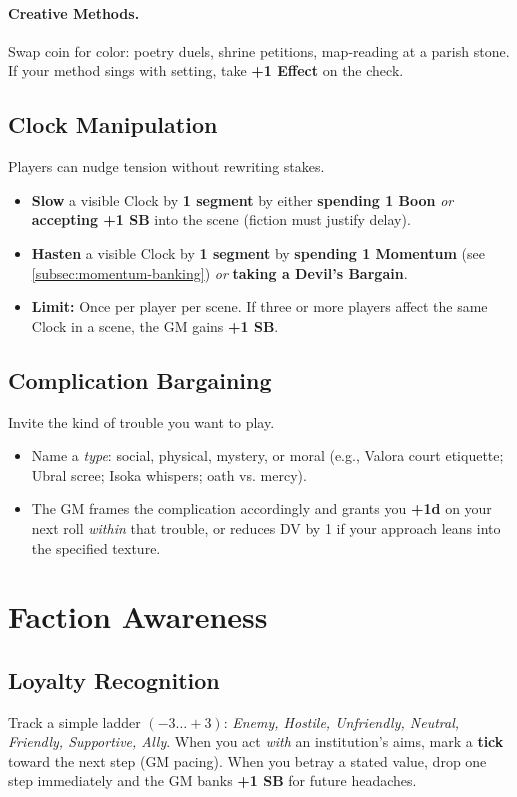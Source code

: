 \paragraph{Creative Methods.}
Swap coin for color: poetry duels, shrine petitions, map‑reading at a parish stone. If your method sings with setting, take \textbf{+1 Effect} on the check.

\subsection{Clock Manipulation}
Players can nudge tension without rewriting stakes.
\begin{itemize}
  \item \textbf{Slow} a visible Clock by \textbf{1 segment} by either \textbf{spending 1 Boon} \emph{or} \textbf{accepting +1 SB} into the scene (fiction must justify delay).
  \item \textbf{Hasten} a visible Clock by \textbf{1 segment} by \textbf{spending 1 Momentum} (see \ref{subsec:momentum-banking}) \emph{or} \textbf{taking a Devil's Bargain}.
  \item \textbf{Limit:} Once per player per scene. If three or more players affect the same Clock in a scene, the GM gains \textbf{+1 SB}.
\end{itemize}

\subsection{Complication Bargaining}
Invite the kind of trouble you want to play.
\begin{itemize}
  \item Name a \emph{type}: social, physical, mystery, or moral (e.g., Valora court etiquette; Ubral scree; Isoka whispers; oath vs. mercy).
  \item The GM frames the complication accordingly and grants you \textbf{+1d} on your next roll \emph{within} that trouble, or reduces DV by 1 if your approach leans into the specified texture.
\end{itemize}

\section{Faction Awareness}

\subsection{Loyalty Recognition}
Track a simple ladder \((-3\ldots+3)\): \textit{Enemy, Hostile, Unfriendly, Neutral, Friendly, Supportive, Ally}. When you act \emph{with} an institution's aims, mark a \textbf{tick} toward the next step (GM pacing). When you betray a stated value, drop one step immediately and the GM banks \textbf{+1 SB} for future headaches.

